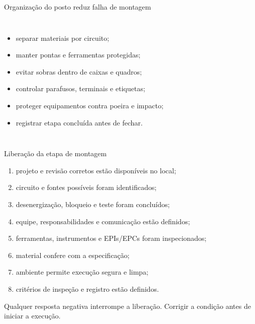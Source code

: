 \begin{frame}{Organização do posto reduz falha de montagem}
\small
\begin{columns}[T,onlytextwidth]
\begin{itemize}
\item separar materiais por circuito;
\item manter pontas e ferramentas protegidas;
\item evitar sobras dentro de caixas e quadros;
\item controlar parafusos, terminais e etiquetas;
\item proteger equipamentos contra poeira e impacto;
\item registrar etapa concluída antes de fechar.
\end{itemize}
\end{columns}
\end{frame}

\begin{frame}{Liberação da etapa de montagem}
\small
\begin{enumerate}
\item projeto e revisão corretos estão disponíveis no local;
\item circuito e fontes possíveis foram identificados;
\item desenergização, bloqueio e teste foram concluídos;
\item equipe, responsabilidades e comunicação estão definidos;
\item ferramentas, instrumentos e EPIs/EPCs foram inspecionados;
\item material confere com a especificação;
\item ambiente permite execução segura e limpa;
\item critérios de inspeção e registro estão definidos.
\end{enumerate}
\begin{caixaAt}
Qualquer resposta negativa interrompe a liberação. Corrigir a condição antes de iniciar a execução.
\end{caixaAt}
\end{frame}
